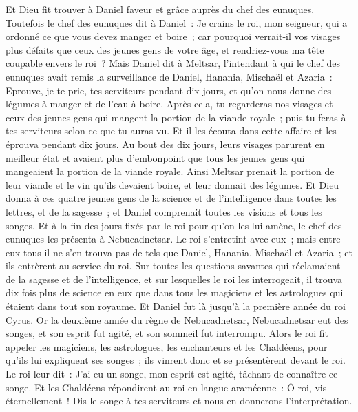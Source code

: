 \begin{multicols}{2}
Et Dieu fit trouver à Daniel faveur et grâce auprès du chef des eunuques.
Toutefois le chef des eunuques dit à Daniel~: Je crains le roi, mon seigneur, qui a ordonné ce que vous devez manger et boire~; car pourquoi verrait-il vos visages plus défaits que ceux des jeunes gens de votre âge, et rendriez-vous ma tête coupable envers le roi~?
Mais Daniel dit à Meltsar, l'intendant à qui le chef des eunuques avait remis la surveillance de Daniel, Hanania, Mischaël et Azaria~:
Eprouve, je te prie, tes serviteurs pendant dix jours, et qu'on nous donne des légumes à manger et de l'eau à boire.
Après cela, tu regarderas nos visages et ceux des jeunes gens qui mangent la portion de la viande royale~; puis tu feras à tes serviteurs selon ce que tu auras vu.
Et il les écouta dans cette affaire et les éprouva pendant dix jours.
Au bout des dix jours, leurs visages parurent en meilleur état et avaient plus d'embonpoint que tous les jeunes gens qui mangeaient la portion de la viande royale.
 Ainsi Meltsar prenait la portion de leur viande et le vin qu'ils devaient boire, et leur donnait des légumes.
Et Dieu donna à ces quatre jeunes gens de la science et de l'intelligence dans toutes les lettres, et de la sagesse~; et Daniel comprenait toutes les visions et tous les songes.
Et à la fin des jours fixés par le roi pour qu'on les lui amène, le chef des eunuques les présenta à Nebucadnetsar.
Le roi s'entretint avec eux~; mais entre eux tous il ne s'en trouva pas de tels que Daniel, Hanania, Mischaël et Azaria~; et ils entrèrent au service du roi.
Sur toutes les questions savantes qui réclamaient de la sagesse et de l'intelligence, et sur lesquelles le roi les interrogeait, il trouva dix fois plus de science en eux que dans tous les magiciens et les astrologues qui étaient dans tout son royaume.
Et Daniel fut là jusqu'à la première année du roi Cyrus.
\VerseOne{}Or la deuxième année du règne de Nebucadnetsar, Nebucadnetsar eut des songes, et son esprit fut agité, et son sommeil fut interrompu.
Alors le roi fit appeler les magiciens, les astrologues, les enchanteurs et les Chaldéens, pour qu'ils lui expliquent ses songes~; ils vinrent donc et se présentèrent devant le roi.
Le roi leur dit~: J'ai eu un songe, mon esprit est agité, tâchant de connaître ce songe.
Et les Chaldéens répondirent au roi en langue araméenne~: Ô roi, vis éternellement~! Dis le songe à tes serviteurs et nous en donnerons l'interprétation.

\end{multicols}
